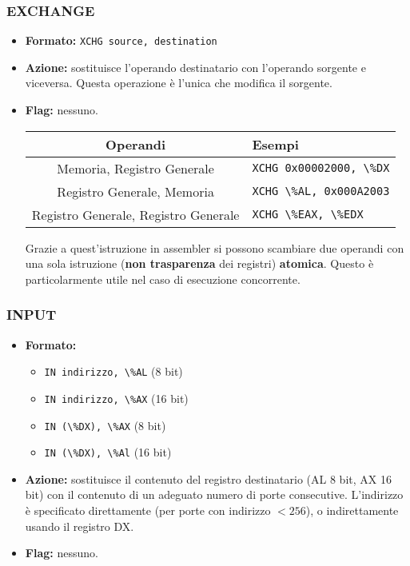 \documentclass[a4paper,11pt]{article}
\begin{document}
\subsubsection{EXCHANGE}
\begin{itemize}
	\item \textbf{Formato:} \lstinline|XCHG source, destination|
	\item \textbf{Azione:} sostituisce l'operando destinatario con l'operando sorgente e viceversa. Questa operazione è l'unica che modifica il sorgente.
	\item \textbf{Flag:} nessuno.

		\begin{table}[h!]
			\center {}
			\begin{tabular} { c | p{7cm} }
				\bfseries Operandi & \bfseries Esempi \\
				\hline 
				Memoria, Registro Generale & \lstinline|XCHG 0x00002000, \%DX| \\
				Registro Generale, Memoria & \lstinline|XCHG \%AL, 0x000A2003| \\
				Registro Generale, Registro Generale & \lstinline|XCHG \%EAX, \%EDX|
			\end{tabular}
		\end{table}

		Grazie a quest'istruzione in assembler si possono scambiare due operandi con una sola istruzione (\textbf{non trasparenza} dei registri) \textbf{atomica}.
		Questo è particolarmente utile nel caso di esecuzione concorrente.
\end{itemize}

\subsubsection{INPUT}
\begin{itemize}
	\item \textbf{Formato:}
		\begin{itemize}
			\item \lstinline|IN indirizzo, \%AL| (8 bit)
			\item \lstinline|IN indirizzo, \%AX| (16 bit)
			\item \lstinline|IN (\%DX), \%AX| (8 bit) 
			\item \lstinline|IN (\%DX), \%Al| (16 bit)
		\end{itemize}
	\item \textbf{Azione:} sostituisce il contenuto del registro destinatario (AL 8 bit, AX 16 bit) con il contenuto di un adeguato numero di porte consecutive.
		L'indirizzo è specificato direttamente (per porte con indirizzo $<256$), o indirettamente usando il registro DX.
	\item \textbf{Flag:} nessuno.
\end{itemize}
\end{document}
